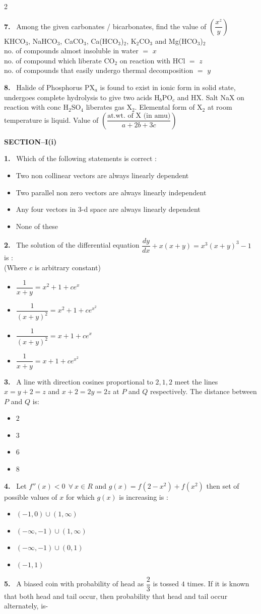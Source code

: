 \documentclass[10pt]{extarticle}
\newcommand{\partsec}[2]{\par\medskip\noindent{\large\bfseries PART-#1: #2}\par\smallskip}
\newcommand{\sect}[1]{\par\smallskip\noindent\textbf{#1}\par}
\newcommand{\qn}[1]{\par\smallskip\noindent\textbf{#1.}~}
\newenvironment{qoptions}{\begin{itemize}[leftmargin=1.8em,itemsep=1pt,topsep=2pt,label={}]}{\end{itemize}}
\newcommand{\opt}[2]{\item[(#1)] #2}
\begin{document}
\begin{multicols}{2}
\qn{7} Among the given carbonates / bicarbonates, find the value of $\left(\dfrac{x^z}{y}\right)$\\
KHCO$_3$, NaHCO$_3$, CaCO$_3$, Ca(HCO$_3$)$_2$, K$_2$CO$_3$ and Mg(HCO$_3$)$_2$\\
no. of compounds almost insoluble in water $=$ $x$\\
no. of compound which liberate CO$_2$ on reaction with HCl $=$ $z$\\
no. of compounds that easily undergo thermal decomposition $=$ $y$
\qn{8} Halide of Phosphorus PX$_a$ is found to exist in ionic form in solid state, undergoes complete hydrolysis to give two acids H$_b$PO$_c$ and HX. Salt NaX on reaction with conc H$_2$SO$_4$ liberates gas X$_2$. Elemental form of X$_2$ at room temperature is liquid. Value of $\left(\dfrac{\text{at.wt. of X (in amu)}}{a+2b+3c}\right)$
\partsec{3}{MATHEMATICS}
\sect{SECTION--I(i)}
\qn{1} Which of the following statements is correct :
\begin{qoptions}
\opt{A}{Two non collinear vectors are always linearly dependent}
\opt{B}{Two parallel non zero vectors are always linearly independent}
\opt{C}{Any four vectors in 3-d space are always linearly dependent}
\opt{D}{None of these}
\end{qoptions}
\qn{2} The solution of the differential equation $\dfrac{dy}{dx}+x(x+y)=x^3(x+y)^3-1$ is :\\
(Where $c$ is arbitrary constant)
\begin{qoptions}
\opt{A}{$\dfrac1{x+y}=x^2+1+ce^x$}
\opt{B}{$\dfrac1{(x+y)^2}=x^2+1+ce^{x^2}$}
\opt{C}{$\dfrac1{(x+y)^2}=x+1+ce^x$}
\opt{D}{$\dfrac1{x+y}=x+1+ce^{x^2}$}
\end{qoptions}
\qn{3} A line with direction cosines proportional to $2,1,2$ meet the lines $x=y+2=z$ and $x+2=2y=2z$ at $P$ and $Q$ respectively. The distance between $P$ and $Q$ is:
\begin{qoptions}
\opt{A}{$2$}
\opt{B}{$3$}
\opt{C}{$6$}
\opt{D}{$8$}
\end{qoptions}
\qn{4} Let $f''(x)<0\ \ \forall\ x\in R$ and $g(x)=f(2-x^2)+f(x^2)$ then set of possible values of $x$ for which $g(x)$ is increasing is :
\begin{qoptions}
\opt{A}{$(-1,0)\cup(1,\infty)$}
\opt{B}{$(-\infty,-1)\cup(1,\infty)$}
\opt{C}{$(-\infty,-1)\cup(0,1)$}
\opt{D}{$(-1,1)$}
\end{qoptions}
\qn{5} A biased coin with probability of head as $\dfrac23$ is tossed $4$ times. If it is known that both head and tail occur, then probability that head and tail occur alternately, is-

\end{multicols}
\end{document}

